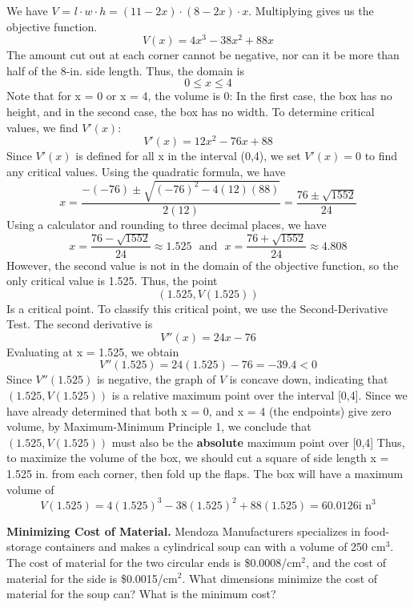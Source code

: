 \documentclass{report}
\begin{document}
\pagebreak
\noindent
We have $V$ = $l\cdot w\cdot h = (11-2x) \cdot (8-2x) \cdot x$. Multiplying gives us the objective function.
$$ V(x) = 4x^3 - 38x^2 +88x$$
The amount cut out at each corner cannot be negative, nor can it be more than half of the 8-in. side length. Thus, the domain is
$$0\leq x \leq 4$$
Note that for x = 0 or x = 4, the volume is 0: In the first case, the box has no height, and in the second case, the box has no width.
\bigbreak \noindent
To determine critical values, we find $V'(x)$:
$$ V'(x) = 12x^2 - 76x + 88$$
Since $V'(x)$ is defined for all x in the interval (0,4), we set $V'(x) = 0$ to find any critical values. Using the quadratic formula, we have
$$ x = \dfrac{-(-76) \pm \sqrt{(-76)^2-4(12)(88)}}{2(12)} = \dfrac{76\pm\sqrt{1552}}{24}$$
Using a calculator and rounding to three decimal places, we have
$$ x  = \dfrac{76-\sqrt{1552}}{24}\approx 1.525 \ \ \ \text{and} \ \ \ x = \dfrac{76+\sqrt{1552}}{24}\approx 4.808$$
However, the second value is not in the domain of the objective function, so the only critical value is 1.525. Thus, the point
$$(1.525, V(1.525))$$
Is a critical point.
\bigbreak \noindent
To classify this critical point, we use the Second-Derivative Test. The second derivative is
$$ V''(x) = 24x-76$$
Evaluating at x = 1.525, we obtain
$$ V''(1.525) = 24(1.525) -76=-39.4 < 0$$
Since $V''(1.525)$ is negative, the graph of $V$ is concave down, indicating that $(1.525, V(1.525))$ is a relative maximum point over the interval [0,4]. Since we have already determined that both x = 0, and x = 4 (the endpoints) give zero volume, by Maximum-Minimum Principle 1, we conclude that $(1.525, V(1.525))$ must also be the \textbf{absolute} maximum point over [0,4]
\bigbreak \noindent
Thus, to maximize the volume of the box, we should cut a square of side length x = 1.525 in. from each corner, then fold up the flaps. The box will have a maximum volume of
$$ V(1.525) = 4(1.525)^3 - 38(1.525)^2 + 88(1.525) = 60.0126 \text{i n}^3$$

\pagebreak
\q
\textbf{Minimizing Cost of Material.} Mendoza Manufacturers specializes in food-storage containers and makes a cylindrical soup can with a volume of 250 cm$^3$. The cost of material for the two circular ends is \$0.0008/cm$^2$, and the cost of material for the side is \$0.0015/cm$^2$. What dimensions minimize the cost of material for the soup can? What is the minimum cost?
\end{document}
